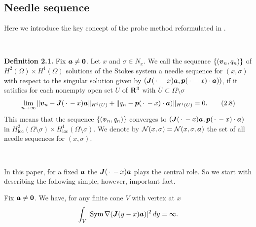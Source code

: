 \subsection{Needle sequence}





Here we introduce the key concept of  the probe method reformulated in \cite{INew}.

 
   




$\quad$



{\bf\noindent Definition 2.1.}  Fix $\mbox{\boldmath $a$}\not=\mbox{\boldmath $0$}$.
Let $x$ and $\sigma\in N_x$.  We call the sequence $\{(\mbox{\boldmath $v$}_n, q_n)\}$ of  $H^2(\Omega)\times H^1(\Omega)$ solutions
of the Stokes system
a needle sequence for $(x,\sigma)$  with respect to the singular solution given by $(\mbox{\boldmath $J$}(\,\cdot\,-x)\mbox{\boldmath $a$}, \mbox{\boldmath $p$}(\,\cdot\,-x)\cdot\mbox{\boldmath $a$}))$,
 if it satisfies 
for each nonempty open set $U$ of  $\Bbb R^3$ with $\overline{U}\subset\Omega\setminus\sigma$
$$\displaystyle
\lim_{n\rightarrow\infty}\Vert\mbox{\boldmath $v$}_n-\mbox{\boldmath $J$}(\,\cdot\,-x)\mbox{\boldmath $a$}\Vert_{H^2(U)}
+\Vert q_n-\mbox{\boldmath $p$}(\,\cdot\,-x)\cdot\mbox{\boldmath $a$})\Vert_{H^1(U)}=0.
\tag {2.8}
$$
This means that the sequence $\{(\mbox{\boldmath $v$}_n, q_n)\}$ converges to $(\mbox{\boldmath $J$}(\,\cdot\,-x)\mbox{\boldmath $a$}, \mbox{\boldmath $p$}(\,\cdot\,-x)\cdot\mbox{\boldmath $a$})$
in $H^2_{\text{loc}}(\Omega\setminus\sigma)\times H^1_{\text{loc}}(\Omega\setminus\sigma)$.
We denote by ${\cal N}(x,\sigma)={\cal N}(x,\sigma,\mbox{\boldmath $a$})$ the set of all needle sequences for $(x,\sigma)$.  


$\quad$



In this paper, for a fixed $\mbox{\boldmath $a$}$ the $\mbox{\boldmath $J$}(\,\cdot\,-x)\mbox{\boldmath $a$}$ plays the central role.
So we start with describing the following simple, however, important fact.



  Fix $\mbox{\boldmath $a$}\not=\mbox{\boldmath $0$}$.
We have, for any finite cone $V$ with vertex at  $x$ 
$$\displaystyle
\int_{V}\vert\text{Sym}\,\nabla(\mbox{\boldmath $J$}(y-x)\mbox{\boldmath $a$})\vert^2\,dy=\infty.
$$

\endproclaim

